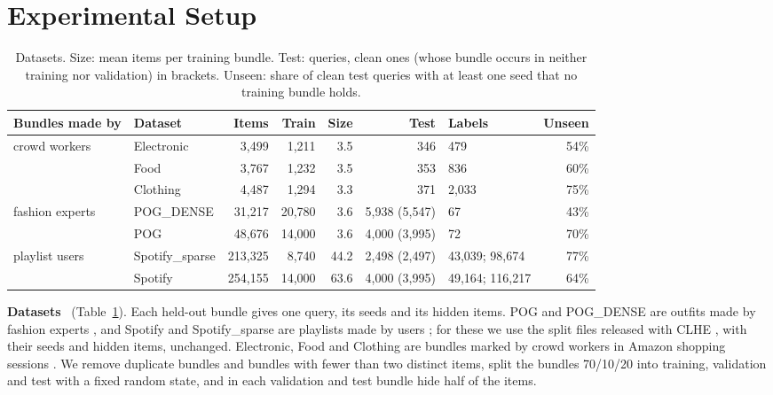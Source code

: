 \documentclass[runningheads]{llncs}
\renewcommand{\paragraph}[1]{\smallskip\noindent\textbf{#1}\ }
\begin{document}
\section{Experimental Setup}\label{sec:setup}

\begin{table}[!htb]
\centering
\caption{Datasets. Size: mean items per training bundle. Test: queries, clean ones (whose bundle occurs in neither
training nor validation) in brackets. Unseen: share of clean test queries with at least one seed that no training
bundle holds.}
\label{tab:data}
\setlength{\tabcolsep}{3pt}
\scriptsize
\begin{tabular}{llrrrrlr}
\toprule
Bundles made by & Dataset & Items & Train & Size & Test & Labels & Unseen\\
\midrule
crowd workers & Electronic & 3,499 & 1,211 & 3.5 & 346 & 479 & 54\%\\
 & Food & 3,767 & 1,232 & 3.5 & 353 & 836 & 60\%\\
 & Clothing & 4,487 & 1,294 & 3.3 & 371 & 2,033 & 75\%\\
fashion experts & POG\_DENSE & 31,217 & 20,780 & 3.6 & 5,938 (5,547) & 67 & 43\%\\
 & POG & 48,676 & 14,000 & 3.6 & 4,000 (3,995) & 72 & 70\%\\
playlist users & Spotify\_sparse & 213,325 & 8,740 & 44.2 & 2,498 (2,497) & 43,039; 98,674 & 77\%\\
 & Spotify & 254,155 & 14,000 & 63.6 & 4,000 (3,995) & 49,164; 116,217 & 64\%\\
\bottomrule
\end{tabular}
\end{table}

\paragraph{Datasets} (Table~\ref{tab:data}). Each held-out bundle gives one query, its seeds and its hidden items.
POG and POG\_DENSE are outfits made by fashion experts \cite{pog}, and Spotify and Spotify\_sparse are playlists made by
users \cite{spotify}; for these we use the split files released with CLHE \cite{clhe}, with their seeds and hidden
items, unchanged. Electronic, Food and Clothing are bundles marked by crowd workers in Amazon shopping sessions
\cite{bundlerec}. We remove duplicate bundles and bundles with fewer than two distinct items, split the bundles
70/10/20 into training, validation and test with a fixed random state, and in each validation and test bundle hide
half of the items.
\end{document}
